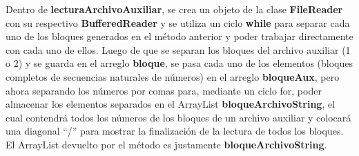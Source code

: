 \documentclass[12pt,letterpaper]{report}
\begin{document}
        	Dentro de \textbf{lecturaArchivoAuxiliar}, se crea un objeto de la clase \textbf{FileReader} con su respectivo \textbf{BufferedReader} y se utiliza un ciclo \textbf{while} para separar cada uno de los bloques generados en el método anterior y poder trabajar directamente con cada uno de ellos. Luego de que se separan los bloques del archivo auxiliar (1 o 2) y se guarda en el arreglo \textbf{bloque}, se pasa cada uno de los elementos (bloques completos de secuencias naturales de números) en el arreglo \textbf{bloqueAux}, pero ahora separando los números por comas para, mediante un ciclo for, poder almacenar los elementos separados en el ArrayList \textbf{bloqueArchivoString}, el cual contendrá todos los números de los bloques de un archivo auxiliar y colocará una diagonal “/” para mostrar la finalización de la lectura de todos los bloques. El ArrayList devuelto por el método es justamente \textbf{bloqueArchivoString}.\\
        	
\end{document}
